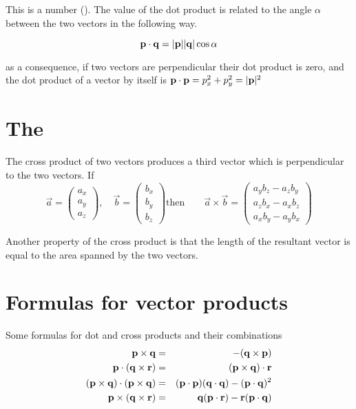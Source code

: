 This is a number (). The value of the dot product is related to the angle $\alpha$ between the two vectors in the 
following way.

$$
   \mathbf{p}\cdot\mathbf{q} = |\mathbf{p}||\mathbf{q}|\cos\alpha
$$

as a consequence, if two vectors are perpendicular their dot product is zero,
and the dot product of a vector by itself is $\mathbf{p}\cdot\mathbf{p} = p_x^2 + p_y^2 = |\mathbf{p}|^2$


\section{The }
The cross product of two vectors produces a third vector which is perpendicular to 
the two vectors. If 
$$
  \vec{a} =  \begin{pmatrix} a_x \\ a_y \\ a_z \end{pmatrix}, \quad
  \vec{b} =  \begin{pmatrix} b_x \\ b_y \\ b_z \end{pmatrix} \text{then} \qquad
   \vec{a}\times\vec{b} = \begin{pmatrix} 
                             a_yb_z - a_zb_y \\
                             a_zb_x - a_xb_z \\
                             a_xb_y - a_yb_x
                          \end{pmatrix}
$$


Another property of the cross product is that the length of the resultant vector 
is equal to the area spanned by the two vectors.

\section{Formulas for vector products}
Some formulas for dot and cross products and their combinations
\begin{eqnarray*}
    \mathbf{p}\times\mathbf{q} & =& -(\mathbf{q}\times\mathbf{p}) \\
    \mathbf{p}\cdot(\mathbf{q}\times\mathbf{r})& =& (\mathbf{p}\times\mathbf{q} )\cdot\mathbf{r} \\
    (\mathbf{p}\times\mathbf{q})\cdot(\mathbf{p}\times\mathbf{q})& =& (\mathbf{p}\cdot\mathbf{p})(\mathbf{q}\cdot\mathbf{q}) - (\mathbf{p}\cdot\mathbf{q})^2 \\
    \mathbf{p}\times(\mathbf{q}\times\mathbf{r})& =& \mathbf{q}(\mathbf{p}\cdot\mathbf{r}) - \mathbf{r}(\mathbf{p}\cdot\mathbf{q})
\end{eqnarray*}



